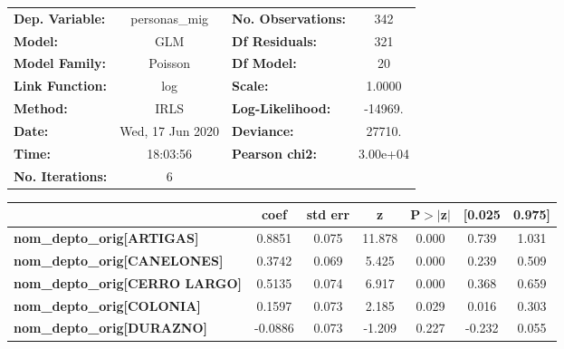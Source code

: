 \begin{center}
\begin{tabular}{lclc}
\toprule
\textbf{Dep. Variable:}                   &  personas\_mig   & \textbf{  No. Observations:  } &      342    \\
\textbf{Model:}                           &       GLM        & \textbf{  Df Residuals:      } &      321    \\
\textbf{Model Family:}                    &     Poisson      & \textbf{  Df Model:          } &       20    \\
\textbf{Link Function:}                   &       log        & \textbf{  Scale:             } &    1.0000   \\
\textbf{Method:}                          &       IRLS       & \textbf{  Log-Likelihood:    } &   -14969.   \\
\textbf{Date:}                            & Wed, 17 Jun 2020 & \textbf{  Deviance:          } &    27710.   \\
\textbf{Time:}                            &     18:03:56     & \textbf{  Pearson chi2:      } &  3.00e+04   \\
\textbf{No. Iterations:}                  &        6         & \textbf{                     } &             \\
\bottomrule
\end{tabular}
\begin{tabular}{lcccccc}
                                          & \textbf{coef} & \textbf{std err} & \textbf{z} & \textbf{P$> |$z$|$} & \textbf{[0.025} & \textbf{0.975]}  \\
\midrule
\textbf{nom\_depto\_orig[ARTIGAS]}        &       0.8851  &        0.075     &    11.878  &         0.000        &        0.739    &        1.031     \\
\textbf{nom\_depto\_orig[CANELONES]}      &       0.3742  &        0.069     &     5.425  &         0.000        &        0.239    &        0.509     \\
\textbf{nom\_depto\_orig[CERRO LARGO]}    &       0.5135  &        0.074     &     6.917  &         0.000        &        0.368    &        0.659     \\
\textbf{nom\_depto\_orig[COLONIA]}        &       0.1597  &        0.073     &     2.185  &         0.029        &        0.016    &        0.303     \\
\textbf{nom\_depto\_orig[DURAZNO]}        &      -0.0886  &        0.073     &    -1.209  &         0.227        &       -0.232    &        0.055     \\

\end{tabular}
\end{center}
